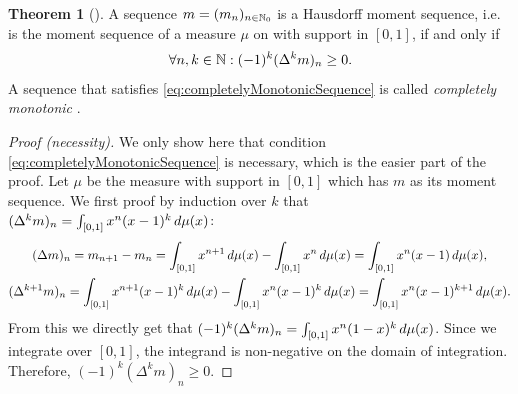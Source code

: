 \documentclass[a4paper]{scrreprt}
\theoremstyle{definition}
\newtheorem{thm}{Theorem}[chapter] %
\begin{document}
    \begin{thm}[\cite{bib:hausdorffMomentprobleme}]
        A sequence $m = (m_n)_{n \in \mathbb{N}_0}$ is a Hausdorff moment sequence, i.e. is the moment sequence of a measure $\mu$ on with support in $[0, 1]$,
        if and only if
        \begin{gather}
            \forall n, k \in \mathbb{N}: (-1)^k (\Delta^k m)_n \geq 0.
            \label{eq:completelyMonotonicSequence}
        \end{gather}
        A sequence that satisfies \eqref{eq:completelyMonotonicSequence} is called \emph{completely monotonic} \cite[Section III.4]{bib:widderTheLaplaceTransform}.
        \label{thm:hausdorffMomentSequenceCharacterization}
    \end{thm}
    \begin{proof}[Proof (necessity)]
        We only show here that condition \eqref{eq:completelyMonotonicSequence} is necessary, which is the easier part of the proof.
        Let $\mu$ be the measure with support in $[0, 1]$ which has $m$ as its moment sequence.
        We first proof by induction over $k$ that $(\Delta^k m)_n = \int_{[0, 1]} x^n (x-1)^k \, d\mu(x)$:
        \begin{gather*}
            (\Delta m)_n 
            = m_{n+1} - m_{n} 
            = \int_{[0, 1]} x^{n+1} \, d\mu(x) - \int_{[0, 1]} x^n \, d\mu(x) 
            = \int_{[0, 1]} x^n(x-1) \, d\mu(x), \\
            (\Delta^{k+1} m)_n
            = \int_{[0, 1]} x^{n+1} (x-1)^k \, d\mu(x) - \int_{[0, 1]} x^n (x-1)^k \, d\mu(x)
            = \int_{[0, 1]} x^{n}(x-1)^{k+1} \, d\mu(x).
        \end{gather*}
        From this we directly get that $(-1)^k (\Delta^k m)_n = \int_{[0, 1]} x^n (1-x)^k \, d\mu(x)$.
        Since we integrate over $[0, 1]$, the integrand is non-negative on the domain of integration.
        Therefore, $(-1)^k (\Delta^k m)_n \geq 0$.
    \end{proof}
\end{document}
